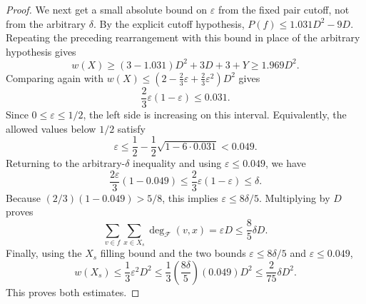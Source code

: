 \begin{proof}
We next get a small absolute bound on $\varepsilon$ from the fixed pair
cutoff, not from the arbitrary $\delta$.  By the explicit cutoff hypothesis,
$P(f)\le1.031D^2-9D$.  Repeating the preceding rearrangement with this
bound in place of the arbitrary hypothesis gives
\[
w(X)\ge (3-1.031)D^2+3D+3+Y\ge1.969D^2.
\]
Comparing again with
$w(X)\le(2-\frac23\varepsilon+\frac23\varepsilon^2)D^2$ gives
\[
\frac23\varepsilon(1-\varepsilon)\le0.031.
\]
Since $0\le\varepsilon\le1/2$, the left side is increasing on this interval.
Equivalently, the allowed values below $1/2$ satisfy
\[
\varepsilon\le \frac12-\frac12\sqrt{1-6\cdot0.031}<0.049 .
\]
Returning to the arbitrary-$\delta$ inequality and using
$\varepsilon\le0.049$, we have
\[
\frac{2\varepsilon}{3}(1-0.049)
\le \frac23\varepsilon(1-\varepsilon)
\le \delta .
\]
Because $(2/3)(1-0.049)>5/8$, this implies
$\varepsilon\le 8\delta/5$.  Multiplying by $D$ proves
\[
\sum_{v\in f}\sum_{x\in X_s}\deg_{\mathcal F}(v,x)
=\varepsilon D\le \frac85\delta D.
\]
Finally, using the $X_s$ filling bound and the two bounds
$\varepsilon\le8\delta/5$ and $\varepsilon\le0.049$,
\[
w(X_s)\le \frac13\varepsilon^2D^2
\le \frac13\left(\frac{8\delta}{5}\right)(0.049)D^2
\le \frac{2}{75}\delta D^2 .
\]
This proves both estimates.
\end{proof}

